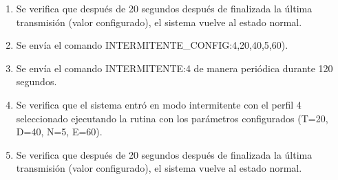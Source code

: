 \begin{enumerate}
\item	Se verifica que después de 20 segundos después de finalizada la última transmisión (valor configurado), el sistema vuelve al estado normal.
\item	Se envía el comando INTERMITENTE\_CONFIG:4,20,40,5,60).
\item	Se envía el comando INTERMITENTE:4 de manera periódica durante 120 segundos.
\item	Se verifica que el sistema entró en modo intermitente con el perfil 4 seleccionado ejecutando la rutina con los parámetros configurados (T=20, D=40, N=5, E=60).
\item	Se verifica que después de 20 segundos después de finalizada la última transmisión (valor configurado), el sistema vuelve al estado normal.

\end{enumerate}

